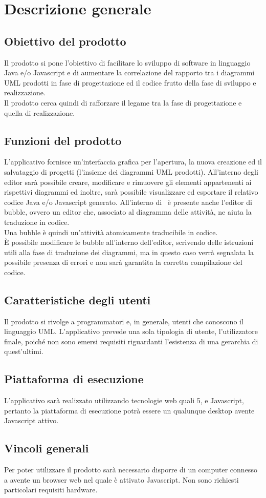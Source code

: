 \documentclass[../AnalisiDeiRequisiti.tex]{subfiles}
\begin{document}
	\section{Descrizione generale}
		\subsection{Obiettivo del prodotto}
			Il prodotto si pone l'obiettivo di facilitare lo sviluppo di software in
			linguaggio Java e/o Javascript e di aumentare la correlazione del rapporto tra
			i diagrammi UML prodotti in fase di progettazione ed il codice frutto della
			fase di sviluppo e realizzazione.\\
			Il prodotto cerca quindi di rafforzare il legame tra la fase di progettazione
			e quella di realizzazione.
		\subsection{Funzioni del prodotto}
			L'applicativo fornisce un'interfaccia grafica per l'apertura, la nuova
			creazione ed il salvataggio di progetti (l'insieme dei diagrammi UML prodotti).
			All'interno degli editor sarà possibile creare, modificare e rimuovere gli
			elementi appartenenti ai rispettivi diagrammi ed inoltre, sarà possibile
			visualizzare ed esportare il relativo codice Java e/o Javascript generato.
			All'interno di \progetto\ è presente anche l'editor di bubble, ovvero un editor
			che, associato al diagramma delle attività, ne aiuta la traduzione in codice.\\
			Una bubble è quindi un'attività atomicamente traducibile in codice.\\
			È possibile modificare le bubble all'interno dell'editor, scrivendo delle istruzioni
			utili alla fase di traduzione dei diagrammi, ma in questo caso verrà segnalata la
			possibile presenza di errori e non sarà garantita la corretta compilazione
			del codice.
		\subsection{Caratteristiche degli utenti}
			Il prodotto si rivolge a programmatori e, in generale, utenti che conoscono
			il linguaggio UML. L'applicativo prevede una sola tipologia di utente,
			l'utilizzatore finale, poiché non sono emersi requisiti riguardanti
			l'esistenza di una gerarchia di quest'ultimi.
		\subsection{Piattaforma di esecuzione}
			L'applicativo sarà realizzato utilizzando tecnologie web quali 5,
			 e Javascript, pertanto la piattaforma di esecuzione potrà essere un
			qualunque  desktop avente Javascript attivo.
		\subsection{Vincoli generali}
			Per poter utilizzare il prodotto sarà necessario disporre di un computer
			connesso a  avente un browser web nel quale è attivato
			Javascript. Non sono richiesti particolari requisiti hardware.
\end{document}
